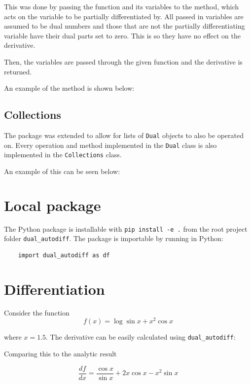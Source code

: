 \documentclass[11pt,a4paper]{article}
\begin{document}
This was done by passing the function and its variables to the method, which acts on the variable to be partially differentiated by. All passed in variables are assumed to be dual numbers and those that are not the partially differentiating variable have their dual parts set to zero. This is so they have no effect on the derivative.

Then, the variables are passed through the given function and the derivative is returned.

An example of the method is shown below:
\subsection{Collections}
The package was extended to allow for lists of \texttt{Dual} objects to also be operated on. Every operation and method implemented in the \texttt{Dual} class is also implemented in the \texttt{Collections} class. 

An example of this can be seen below:
\begin{landscape}
\end{landscape}

\section{Local package}
The Python package is installable with \texttt{pip install -e .} from the root project folder \texttt{dual\_autodiff}. The package is importable by running in Python:

\begin{lstlisting}
    import dual_autodiff as df
\end{lstlisting}

\section{Differentiation}
Consider the function
\begin{equation}
    f(x) = \log{\sin{x}} + x^2 \cos{x}
    \label{eq:func}
\end{equation}

where $x=1.5$. The derivative can be easily calculated using \texttt{dual\_autodiff}:

Comparing this to the analytic result

\begin{equation}
    \frac{df}{dx} = \frac{\cos{x}}{\sin{x}} + 2 x \cos{x} - x^2 \sin{x} 
\end{equation}
\end{document}
